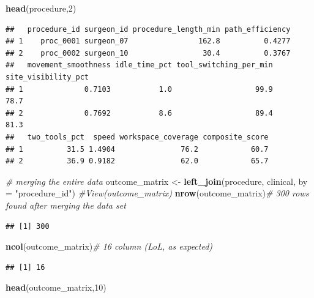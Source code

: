 \documentclass[
]{article}
\newenvironment{Shaded}{\begin{snugshade}}{\end{snugshade}}
\newcommand{\AttributeTok}[1]{\textcolor[rgb]{0.13,0.29,0.53}{#1}}
\newcommand{\CommentTok}[1]{\textcolor[rgb]{0.56,0.35,0.01}{\textit{#1}}}
\newcommand{\DecValTok}[1]{\textcolor[rgb]{0.00,0.00,0.81}{#1}}
\newcommand{\FunctionTok}[1]{\textcolor[rgb]{0.13,0.29,0.53}{\textbf{#1}}}
\newcommand{\NormalTok}[1]{#1}
\newcommand{\OtherTok}[1]{\textcolor[rgb]{0.56,0.35,0.01}{#1}}
\newcommand{\StringTok}[1]{\textcolor[rgb]{0.31,0.60,0.02}{#1}}
\begin{document}
\begin{Shaded}
\begin{Highlighting}[]
\FunctionTok{head}\NormalTok{(procedure,}\DecValTok{2}\NormalTok{)}
\end{Highlighting}
\end{Shaded}

\begin{verbatim}
##   procedure_id surgeon_id procedure_length_min path_efficiency
## 1    proc_0001 surgeon_07                162.8          0.4277
## 2    proc_0002 surgeon_10                 30.4          0.3767
##   movement_smoothness idle_time_pct tool_switching_per_min site_visibility_pct
## 1              0.7103           1.0                   99.9                78.7
## 2              0.7692           8.6                   89.4                81.3
##   two_tools_pct  speed workspace_coverage composite_score
## 1          31.5 1.4904               76.2            60.7
## 2          36.9 0.9182               62.0            65.7
\end{verbatim}

\begin{Shaded}
\begin{Highlighting}[]
\CommentTok{\# merging the entire data }
\NormalTok{outcome\_matrix }\OtherTok{\textless{}{-}} \FunctionTok{left\_join}\NormalTok{(procedure, clinical, }\AttributeTok{by =} \StringTok{"procedure\_id"}\NormalTok{)}
\CommentTok{\#View(outcome\_matrix)}
\FunctionTok{nrow}\NormalTok{(outcome\_matrix)}\CommentTok{\# 300 rows found after merging the data set}
\end{Highlighting}
\end{Shaded}

\begin{verbatim}
## [1] 300
\end{verbatim}

\begin{Shaded}
\begin{Highlighting}[]
\FunctionTok{ncol}\NormalTok{(outcome\_matrix)}\CommentTok{\# 16 column (LoL, as expected)}
\end{Highlighting}
\end{Shaded}

\begin{verbatim}
## [1] 16
\end{verbatim}

\begin{Shaded}
\begin{Highlighting}[]
\FunctionTok{head}\NormalTok{(outcome\_matrix,}\DecValTok{10}\NormalTok{)}
\end{Highlighting}
\end{Shaded}
\end{document}

